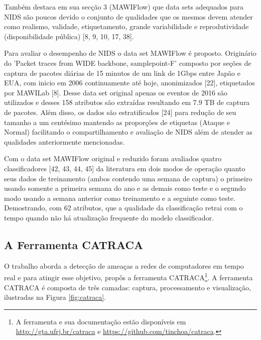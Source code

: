 Também destaca em sua secção 3 (MAWIFlow) 
que data sets adequados para NIDS são poucos devido o conjunto de qualidades que os mesmos
devem atender como realismo, validade, etiquetamento, grande variabilidade
e reprodutividade (disponibilidade pública) [8, 9, 10, 17, 38].


Para avaliar o desempenho de NIDS o data set MAWIFlow é proposto. Originário do
'Packet traces from WIDE backbone, samplepoint-F' composto por seções de captura
de pacotes diárias de 15 minutos de um link de 1Gbps entre Japão e EUA, com
inicio em 2006 continuamente até hoje, anonimizados [22], etiquetados por
MAWILab [8].
Desse data set original apenas os eventos de 2016 são utilizados e desses 158
atributos são extraídas resultando em 7.9 TB de captura de pacotes.
Além disso, os dados são estratificados [24] para redução de seu tamanho a um
centésimo mantendo as proporções de etiquetas (Ataque e Normal) facilitando o
compartilhamento e avaliação de NIDS além de atender as qualidades anteriormente
mencionadas.

Com o data set MAWIFlow original e reduzido foram avaliados quatro classificadores [42, 43, 44, 45]
da literatura em dois modos de operação quanto seus dados de treinamento
(ambos contendo uma semana de captura) o primeiro usando somente a primeira semana do ano e as demais
como teste e o segundo modo usando a semana anterior como treinamento e a seguinte como teste.
Demostrando, com 62 atributos, que a qualidade da classificação retrai com o tempo quando não há
atualização frequente do modelo classificador.

\subsection{A Ferramenta CATRACA}

O trabalho  aborda a detecção de ameaças a redes de
computadores em tempo real e para atingir esse objetivo, propôs a ferramenta
CATRACA\footnote{
    A ferramenta e sua documentação estão disponíveis em \url{http://gta.ufrj.br/catraca}
    e \url{https://github.com/tinchoa/catraca}.
}.
A ferramenta CATRACA é composta de três camadas: captura, processamento e
visualização, ilustradas na Figura \ref{fig:catraca}.

